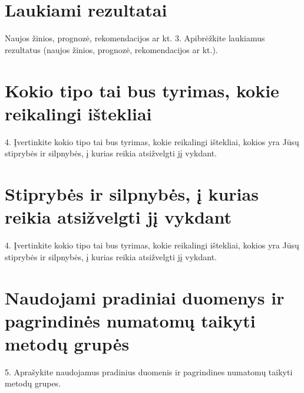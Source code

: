 \documentclass{article}
\begin{document}
\section{Laukiami rezultatai}
{\small Naujos žinios, prognozė, rekomendacijos ar kt.}
3. Apibrėžkite laukiamus rezultatus (naujos žinios, prognozė, rekomendacijos ar kt.).

\section{Kokio tipo tai bus tyrimas, kokie reikalingi ištekliai}
4. Įvertinkite kokio tipo tai bus tyrimas, kokie reikalingi ištekliai, kokios yra Jūsų stiprybės ir silpnybės, į kurias reikia atsižvelgti jį vykdant.

\section{Stiprybės ir silpnybės, į kurias reikia atsižvelgti jį vykdant}
4. Įvertinkite kokio tipo tai bus tyrimas, kokie reikalingi ištekliai, kokios yra Jūsų stiprybės ir silpnybės, į kurias reikia atsižvelgti jį vykdant.

\section{Naudojami pradiniai duomenys ir pagrindinės numatomų taikyti metodų grupės}
5. Aprašykite naudojamus pradinius duomenis ir pagrindines numatomų taikyti metodų grupes.

\printbibliography
\end{document}
